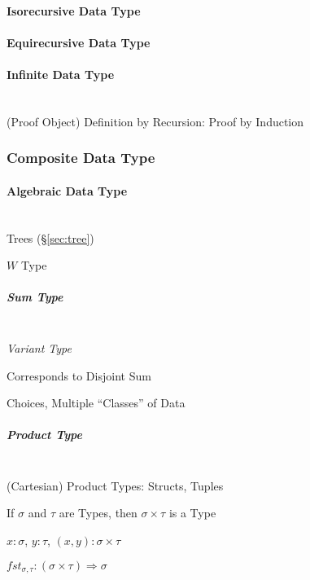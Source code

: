 \paragraph{Isorecursive Data Type}\label{sec:isorecursive_datatype}

\paragraph{Equirecursive Data Type}\label{sec:equirecursive_datatype}



\paragraph{Infinite Data Type}\label{sec:infinite_datatype}
\hfill \\

(Proof Object) Definition by Recursion: Proof by Induction



\subsubsection{Composite Data Type}\label{sec:composite_datatype}

\paragraph{Algebraic Data Type}\label{sec:algebraic_datatype}
\hfill \\

Trees (\S\ref{sec:tree})

$W$ Type



\subparagraph{Sum Type}\label{sec:sum_type}
\hfill \\

\emph{Variant Type}

Corresponds to Disjoint Sum

Choices, Multiple ``Classes'' of Data



\subparagraph{Product Type}\label{sec:product_type}
\hfill \\

(Cartesian) Product Types: Structs, Tuples

If $\sigma$ and $\tau$ are Types, then $\sigma \times \tau$ is a Type

$x : \sigma$, $y : \tau$, $(x,y) : \sigma \times \tau$

$fst_{\sigma,\tau} : (\sigma \times \tau) \Rightarrow \sigma$

